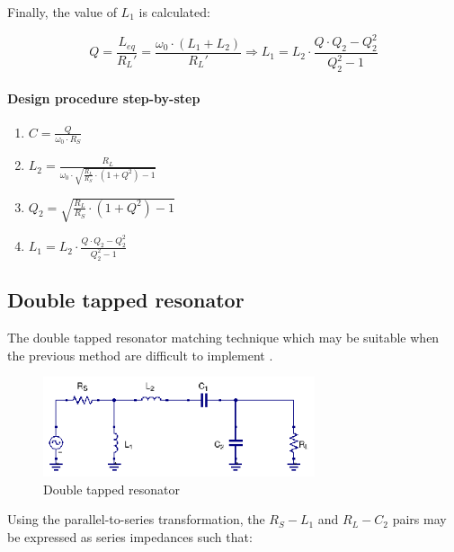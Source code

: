 \noindent Finally, the value of $L_1$ is calculated:

\begin{equation}
Q = \frac{L_{eq}}{R_L'} = \frac{\omega_0 \cdot (L_1 + L_2)}{R_L'} \Longrightarrow L_1 = L_2 \cdot \frac{Q \cdot Q_2 - Q_2^2}{Q_2^2 - 1}
\end{equation}

\paragraph{Design procedure step-by-step}

\begin{enumerate}
  \item $C  = \frac{Q}{\omega_0 \cdot R_S}$
  \item $L_2 = \frac{R_L}{\omega_0 \cdot \sqrt{\frac{R_L}{R_S} \cdot (1 + Q^2) - 1}}$
  \item $Q_2 = \sqrt{\frac{R_L}{R_S} \cdot (1 + Q^2) - 1}$
  \item $L_1 = L_2 \cdot \frac{Q \cdot Q_2 - Q_2^2}{Q_2^2 - 1}$
\end{enumerate}

\subsection{Double tapped resonator}
\noindent The double tapped resonator matching technique which may be suitable when the previous method are difficult to implement \cite{TheDesignofCMOSRFIC}.

\begin{figure}[H]
\centering
\includegraphics[width=80mm]{Double-Tapped-Resonator}
\caption{Double tapped resonator}
\label{fig:double-tapped-resonator}
\end{figure}

\noindent Using the parallel-to-series transformation, the $R_S-L_1$ and $R_L-C_2$ pairs may be expressed as series impedances such that:

